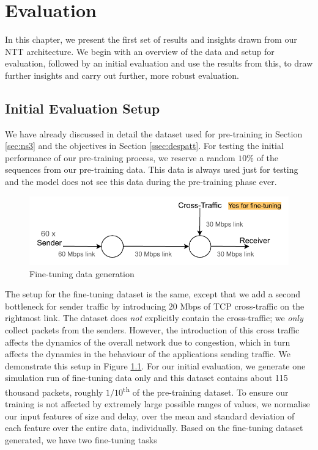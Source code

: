 \chapter{Evaluation}
\label{cha:evaluation}

In this chapter, we present the first set of results and insights drawn from our NTT architecture. We begin with an overview of the data and setup for evaluation, followed by an initial evaluation and use the results from this,  to draw further insights and carry out further, more robust evaluation.

\section{Initial Evaluation Setup}
\label{eval:evaldat}

We have already discussed in detail the dataset used for pre-training in Section \ref{sec:ns3} and the objectives in Section \ref{ssec:despatt}. For testing the initial performance of our pre-training process, we reserve a random $10\%$ of the sequences from our pre-training data. This data is always used just for testing and the model does not see this data during the pre-training phase ever. 

\begin{figure}[h]
  \begin{center}
    \includegraphics[scale=1.2]{figures/simple_topo_ft.pdf}
    \caption{Fine-tuning data generation}
    \label{fig:topo_ft}
  \end{center}
\end{figure}

The setup for the fine-tuning dataset is the same, except that we add a second bottleneck for sender traffic by introducing $20$ Mbps of TCP cross-traffic on the rightmost link. The dataset does \emph{not} explicitly contain the cross-traffic; we \emph{only} collect packets from the senders. However, the introduction of this cross traffic affects the dynamics of the overall network due to  congestion, which in turn affects the dynamics in the behaviour of the applications sending traffic. We demonstrate this setup in Figure \ref{fig:topo_ft}. For our initial evaluation, we generate one simulation run of fine-tuning data only and this dataset contains about 115 thousand packets, \ie roughly $1/10$\textsuperscript{th} of the pre-training dataset. To ensure our training is not affected by extremely large possible ranges of values, we normalise our input features of size and delay, over the mean and standard deviation of each feature over the entire data, individually.\cite{scaling} Based on the fine-tuning dataset generated, we have two fine-tuning tasks 

